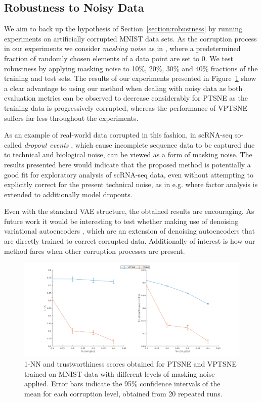 \subsection{Robustness to Noisy Data}

We aim to back up the hypothesis of Section~\ref{section:robustness} by running experiments on artificially corrupted MNIST data sets. As the corruption process in our experiments we consider \textit{masking noise} as in \cite{stacked_denoising_ae}, where a predetermined fraction of randomly chosen elements of a data point are set to 0. We test robustness by applying masking noise to 10\%, 20\%, 30\% and 40\% fractions of the training and test sets. The results of our experiments presented in Figure~\ref{fig:corrupted_data} show a clear advantage to using our method when dealing with noisy data as both evaluation metrics can be observed to decrease considerably for PTSNE as the training data is progressively corrupted, whereas the performance of VPTSNE suffers far less throughout the experiments.

As an example of real-world data corrupted in this fashion, in scRNA-seq so-called \textit{dropout events} \cite{sc_dropout}, which cause incomplete sequence data to be captured due to technical and biological noise, can be viewed as a form of masking noise. The results presented here would indicate that the proposed method is potentially a good fit for exploratory analysis of scRNA-seq data, even without attempting to explicitly correct for the present technical noise, as in e.g. \cite{zifa} where factor analysis is extended to additionally model dropouts.

Even with the standard VAE structure, the obtained results are encouraging. As future work it would be interesting to test whether making use of denoising variational autoencoders \cite{denoising_vae}, which are an extension of denoising autoencoders \cite{stacked_denoising_ae} that are directly trained to correct corrupted data. Additionally of interest is how our method fares when other corruption processes are present.

\begin{figure}[!htb]
  \centering
  \includegraphics[width=\textwidth]{images/corrupted.png}
  \caption{1-NN and trustworthiness scores obtained for PTSNE and VPTSNE trained on MNIST data with different levels of masking noise applied. Error bars indicate the 95\% confidence intervals of the mean for each corruption level, obtained from 20 repeated runs.}
  \label{fig:corrupted_data}
\end{figure}

